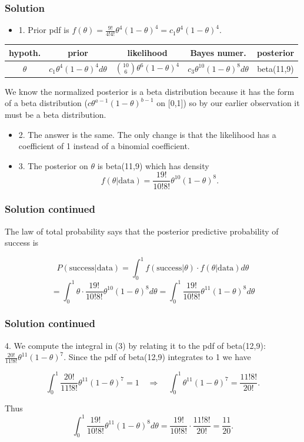 \documentclass[12pt]{beamer}
\begin{document}
\begin{frame}
	\frametitle{Solution}
	\begin{itemize}[label={\color{blue}$\blacktriangleright$}]
		\item 1. Prior pdf is $f(\theta) = \frac{9!}{4!4!}\theta^4(1-\theta)^4 = c_1\theta^4(1-\theta)^4$.
	\end{itemize}
	
		\begin{center}
			{\footnotesize
		\begin{tabular}{|c|c|c|c|c|}
			\hline
			hypoth. & prior & likelihood & Bayes numer. & posterior \\
			\hline
			$\theta$ & $c_1\theta^4(1-\theta)^4 d\theta$ & $\binom{10}{6}\theta^6(1-\theta)^4$ & $c_3\theta^{10}(1-\theta)^8 d\theta$ & beta(11,9) \\
			\hline
		\end{tabular}}
	\end{center}
	
	We know the normalized posterior is a beta distribution because it has the form of a beta distribution ($c\theta^{a-1}(1-\theta)^{b-1}$ on [0,1]) so by our earlier observation it must be a beta distribution.
	\begin{itemize}[label={\color{blue}$\blacktriangleright$}]
	\item 2. The answer is the same. The only change is that the likelihood has a coefficient of 1 instead of a binomial coefficient.
	
	\item 3. The posterior on $\theta$ is beta(11,9) which has density
	\[ f(\theta|\text{data}) = \frac{19!}{10!8!}\theta^{10}(1-\theta)^8. \]
\end{itemize}
\end{frame}
\begin{frame}
	\frametitle{Solution continued}
	
	The law of total probability says that the posterior predictive probability of success is
	
	\[ P(\text{success}|\text{data}) = \int_0^1 f(\text{success}|\theta) \cdot f(\theta|\text{data}) d\theta \]
	\[ = \int_0^1 \theta \cdot \frac{19!}{10!8!}\theta^{10}(1-\theta)^8 d\theta = \int_0^1 \frac{19!}{10!8!}\theta^{11}(1-\theta)^8 d\theta \]
\end{frame}
\begin{frame}
	\frametitle{Solution continued}
	4. We compute the integral in (3) by relating it to the pdf of beta(12,9): $\frac{20!}{11!8!}\theta^{11}(1-\theta)^7$. Since the pdf of beta(12,9) integrates to 1 we have
	
	\[ \int_0^1 \frac{20!}{11!8!}\theta^{11}(1-\theta)^7 = 1 \quad \Rightarrow \quad \int_0^1 \theta^{11}(1-\theta)^7 = \frac{11!8!}{20!}. \]
	
	Thus
	\[ \int_0^1 \frac{19!}{10!8!}\theta^{11}(1-\theta)^8 d\theta = \frac{19!}{10!8!} \cdot \frac{11!8!}{20!} = \boxed{\frac{11}{20}}. \]
	
\end{frame}
\end{document}
